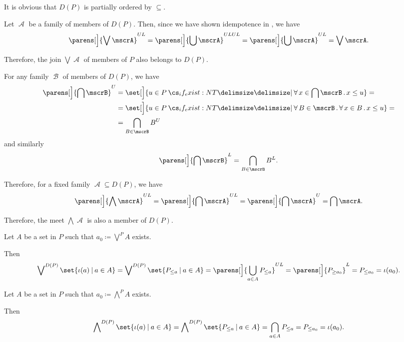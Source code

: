 \begin{defproof}
  It is obvious that \( D(P) \) is partially ordered by \( \subseteq \).

   Let \( \mscrA \) be a family of members of \( D(P) \). Then, since we have shown idempotence in , we have
  \begin{equation*}
    \parens[\Big]{ \bigvee \mscrA }^{UL}
    =
    \parens[\Big]{ \bigcup \mscrA }^{ULUL}
    =
    \parens[\Big]{ \bigcup \mscrA }^{UL}
    =
    \bigvee \mscrA.
  \end{equation*}

  Therefore, the join \( \bigvee \mscrA \) of members of \( P \) also belongs to \( D(P) \).

   For any family \( \mscrB \) of members of \( D(P) \), we have
  \begin{align*}
    \parens[\Big]{ \bigcap \mscrB }^U
    &=
    \set[\Big]{ u \in P \given* \qforall {x \in \bigcap \mscrB} x \leq u }
    = \\ &=
    \set[\Big]{ u \in P \given* \qforall {B \in \mscrB} \qforall {x \in B} x \leq u }
    = \\ &=
    \bigcap_{B \in \mscrB} B^U
  \end{align*}
  and similarly
  \begin{equation*}
    \parens[\Big]{ \bigcap \mscrB }^L
    =
    \bigcap_{B \in \mscrB} B^L.
  \end{equation*}

  Therefore, for a fixed family \( \mscrA \subseteq D(P) \), we have
  \begin{equation*}
    \parens[\Big]{ \bigwedge \mscrA }^{UL}
    =
    \parens[\Big]{ \bigcap \mscrA }^{UL}
    =
    \parens[\Big]{ \bigcap \mscrA }^U
    =
    \bigcap \mscrA.
  \end{equation*}

  Therefore, the meet \( \bigwedge \mscrA \) is also a member of \( D(P) \).

   Let \( A \) be a set in \( P \) such that \( a_0 \coloneqq \bigvee^P A \) exists.

  Then
  \begin{equation*}
    \bigvee\nolimits^{D(P)} \set{ \iota(a) \given a \in A }
    =
    \bigvee\nolimits^{D(P)} \set{ P_{\leq a} \given a \in A }
    =
    \parens[\Big]{ \bigcup_{a \in A} P_{\leq a} }^{UL}
    =
    \parens[\Big]{ P_{\geq a_0} }^L
    =
    P_{\leq a_0}
    =
    \iota(a_0).
  \end{equation*}

   Let \( A \) be a set in \( P \) such that \( a_0 \coloneqq \bigwedge^P A \) exists.

  Then
  \begin{equation*}
    \bigwedge\nolimits^{D(P)} \set{ \iota(a) \given a \in A }
    =
    \bigwedge\nolimits^{D(P)} \set{ P_{\leq a} \given a \in A }
    =
    \bigcap_{a \in A} P_{\leq a}
    =
    P_{\leq a_0}
    =
    \iota(a_0).
  \end{equation*}
\end{defproof}

